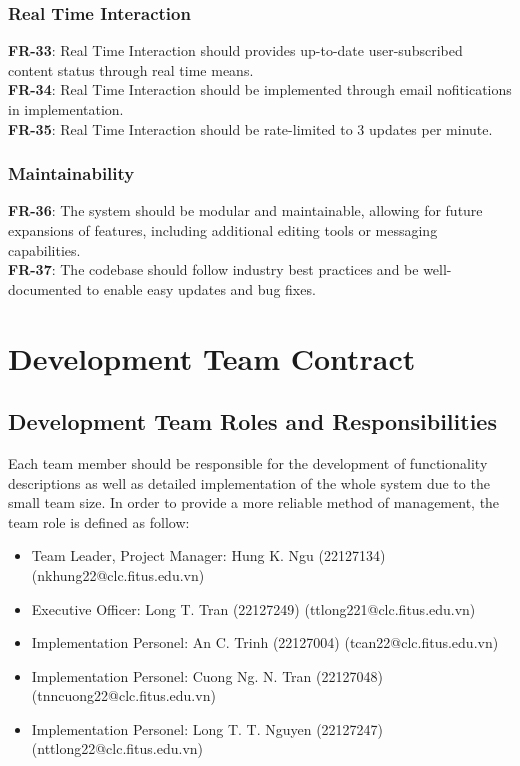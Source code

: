         \subsection{Real Time Interaction}
        \textbf{FR-33}: Real Time Interaction should provides up-to-date user-subscribed content status
        through real time means.
        \\
        \textbf{FR-34}: Real Time Interaction should be implemented through email nofitications in implementation.
        \\
        \textbf{FR-35}: Real Time Interaction should be rate-limited to 3 updates per minute.

        \subsection{Maintainability}
        \textbf{FR-36}: The system should be modular and maintainable, allowing for future expansions of features, including additional editing tools or messaging capabilities.
        \\
        \textbf{FR-37}: The codebase should follow industry best practices and be well-documented to enable easy updates and bug fixes.
\newpage

\chapter{Development Team Contract}

    \section{Development Team Roles and Responsibilities}
    Each team member should be responsible for the development of functionality descriptions as well as detailed
    implementation of the whole system due to the small team size.
    In order to provide a more reliable method of man­age­ment, the team role is defined as follow:
    \begin{itemize}
        \item Team Leader, Project Manager: Hung K. Ngu (22127134) (nkhung22@clc.fitus.edu.vn)
        \item Executive Officer: Long T. Tran (22127249) (ttlong221@clc.fitus.edu.vn)
        \item Implementation Personel: An C. Trinh (22127004) (tcan22@clc.fitus.edu.vn)
        \item Implementation Personel: Cuong Ng. N. Tran (22127048) (tnncuong22@clc.fitus.edu.vn)
        \item Implementation Personel: Long T. T. Nguyen (22127247) (nttlong22@clc.fitus.edu.vn) 
    \end{itemize}
    
